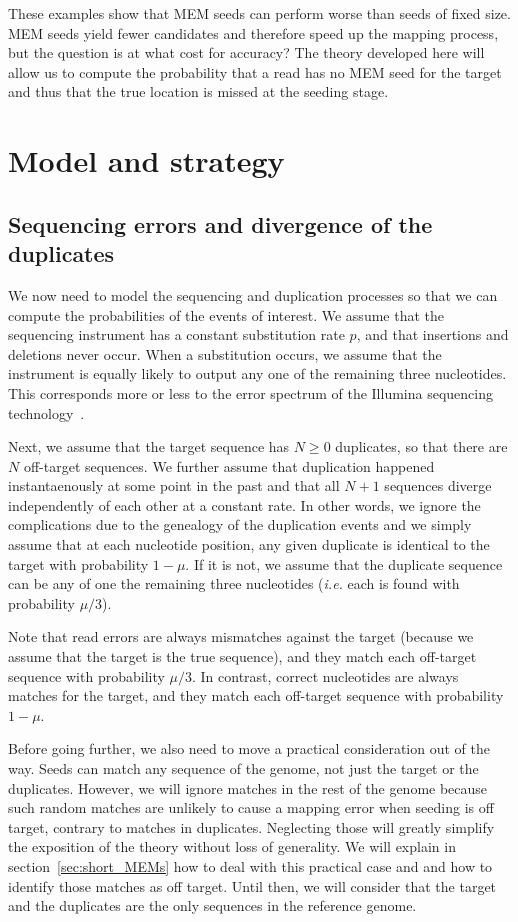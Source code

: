 \documentclass{article}
\begin{document}
These examples show that MEM seeds can perform worse than seeds of fixed
size. MEM seeds yield fewer candidates and therefore speed up the mapping
process, but the question is at what cost for accuracy? The theory
developed here will allow us to compute the probability that a read has
no MEM seed for the target and thus that the true location is missed at
the seeding stage.


\section{Model and strategy}
\label{sec:symbolic}

\subsection{Sequencing errors and divergence of the duplicates}
\label{sec:error}

We now need to model the sequencing and duplication processes so that
we can compute the probabilities of the events of interest. We assume that
the sequencing instrument has a constant substitution rate $p$, and that
insertions and deletions never occur. When a substitution occurs, we
assume that the instrument is equally likely to output any one of the
remaining three nucleotides. This corresponds more or less to the error
spectrum of the Illumina sequencing technology~\cite{pmid21576222}.

Next, we assume that the target sequence has $N \geq 0$ duplicates, so
that there are $N$ off-target sequences. We further assume that
duplication happened instantaenously at some point in the past and that
all $N+1$ sequences diverge independently of each other at a constant
rate. In other words, we ignore the complications due to the genealogy of
the duplication events and we simply assume that at each nucleotide
position, any given duplicate is identical to the target with probability
$1-\mu$. If it is not, we assume that the duplicate sequence can be any of
one the remaining three nucleotides (\textit{i.e.} each is found with
probability $\mu/3$).

Note that read errors are always mismatches against the target (because we
assume that the target is the true sequence), and they match each
off-target sequence with probability $\mu/3$. In contrast, correct
nucleotides are always matches for the target, and they match each
off-target sequence with probability $1-\mu$.

Before going further, we also need to move a practical consideration out
of the way. Seeds can match any sequence of the genome, not just the
target or the duplicates. However, we will ignore matches in the rest of
the genome because such random matches are unlikely to cause a mapping
error when seeding is off target, contrary to matches in duplicates.
Neglecting those will greatly simplify the exposition of the theory
without loss of generality. We will explain in
section~\ref{sec:short_MEMs} how to deal with this practical case and and
how to identify those matches as off target. Until then, we will consider
that the target and the duplicates are the only sequences in the reference
genome.
\end{document}
